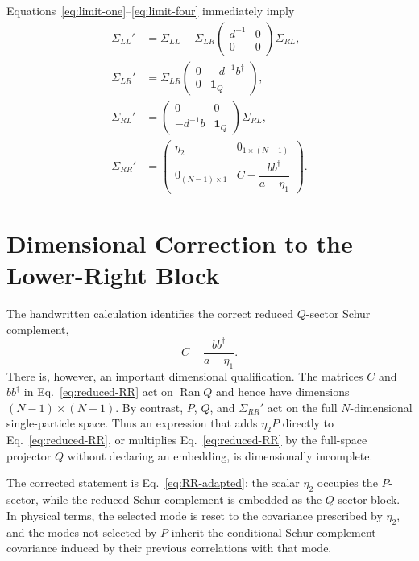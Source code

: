 \documentclass[aps,prb,onecolumn,nofootinbib,superscriptaddress]{revtex4-2}
\newcommand{\I}{\mathbf{1}}
\newcommand{\Ran}{\operatorname{Ran}}
\theoremstyle{plain}
\theoremstyle{definition}
\begin{document}
Equations~\eqref{eq:limit-one}--\eqref{eq:limit-four} immediately imply
\begin{align}
  \Sigma_{LL}'
  &=
  \Sigma_{LL}
  -
  \Sigma_{LR}
  \begin{pmatrix}
    d^{-1}&0\\0&0
  \end{pmatrix}
  \Sigma_{RL},
  \label{eq:LL-adapted}
  \\
  \Sigma_{LR}'
  &=
  \Sigma_{LR}
  \begin{pmatrix}
    0&-d^{-1}b^\dagger\\
    0&\I_Q
  \end{pmatrix},
  \label{eq:LR-adapted}
  \\
  \Sigma_{RL}'
  &=
  \begin{pmatrix}
    0&0\\
    -d^{-1}b&\I_Q
  \end{pmatrix}
  \Sigma_{RL},
  \label{eq:RL-adapted}
  \\
  \Sigma_{RR}'
  &=
  \boxed{
  \begin{pmatrix}
    \eta_2&0_{1\times(N-1)}\\[4pt]
    0_{(N-1)\times1}
    &
    C-\dfrac{bb^\dagger}{a-\eta_1}
  \end{pmatrix}
  }.
  \label{eq:RR-adapted}
\end{align}

\section{Dimensional Correction to the Lower-Right Block}

The handwritten calculation identifies the correct reduced \(Q\)-sector
Schur complement,
\begin{equation}
  C-\frac{bb^\dagger}{a-\eta_1}.
  \label{eq:reduced-RR}
\end{equation}
There is, however, an important dimensional qualification.  The matrices
\(C\) and \(bb^\dagger\) in Eq.~\eqref{eq:reduced-RR} act on
\(\Ran Q\) and hence have dimensions \((N-1)\times(N-1)\).  By contrast,
\(P\), \(Q\), and \(\Sigma_{RR}'\) act on the full \(N\)-dimensional
single-particle space.  Thus an expression that adds \(\eta_2P\) directly
to Eq.~\eqref{eq:reduced-RR}, or multiplies Eq.~\eqref{eq:reduced-RR} by the
full-space projector \(Q\) without declaring an embedding, is dimensionally
incomplete.

The corrected statement is Eq.~\eqref{eq:RR-adapted}: the scalar
\(\eta_2\) occupies the \(P\)-sector, while the reduced Schur complement is
embedded as the \(Q\)-sector block.  In physical terms, the selected mode is
reset to the covariance prescribed by \(\eta_2\), and the modes not selected
by \(P\) inherit the conditional Schur-complement covariance induced by their
previous correlations with that mode.
\end{document}
